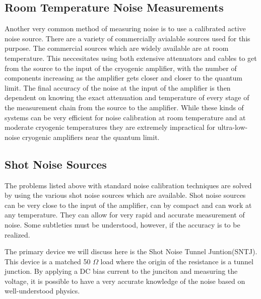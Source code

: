 \documentclass{report}
\begin{document}
	\subsection{Room Temperature Noise Measurements}
	
	Another very common method of measuring noise is to use a calibrated active noise source.  There are a variety of commercially avialable sources used for this purpose.  The commercial sources which are widely available are at room temperature.  This neccesitates using both extensive attenuators and cables to get from the source to the input of the cryogenic amplifier, with the number of components increasing as the amplifier gets closer and closer to the quantum limit.  The final accuracy of the noise at the input of the amplifier is then dependent on knowing the exact attenuation and temperature of every stage of the measurement chain from the source to the amplifier.  While these kinds of systems can be very efficient for noise calibration at room temperature and at moderate cryogenic temperatures they are extremely impractical for ultra-low-noise cryogenic amplifiers near the quantum limit.  

	\subsection{Shot Noise Sources}
	

	The problems listed above with standard noise calibration techniques are solved by using the various shot noise sources which are available.  Shot noise sources can be very close to the input of the amplifier, can by compact and can work at any temperature.  They can allow for very rapid and accurate measurement of noise.  Some subtleties must be understood, however, if the accuracy is to be realized.  

	The primary device we will discuss here is the Shot Noise Tunnel Juntion(SNTJ).  This device is a matched 50 $\Omega$ load where the origin of the resistance is a tunnel junction.  By applying a DC bias current to the junciton and measuring the voltage, it is possible to have a very accurate knowledge of the noise based on well-understood physics.  
\end{document}
